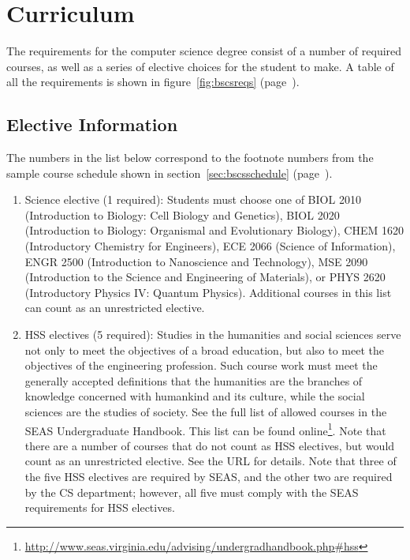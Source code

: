 \documentclass[10pt,letter,twocolumn]{book}
\newcommand{\mysection}[1]{\section{#1}\renewcommand{\rightmark}{#1}}
\newcommand{\myurl}[1]{\footnote{\scriptsize\url{#1}}}
\begin{document}
\mysection{Curriculum}

The requirements for the computer science degree consist of a number
of required courses, as well as a series of elective choices for the
student to make.  A table of all the requirements is shown in
figure~\ref{fig:bscsreqs} (page~\pageref{fig:bscsreqs}).

\subsection{Elective Information}
\label{sec:electiveinfo}

The numbers in the list below correspond to the footnote numbers from
the sample course schedule shown in section~\ref{sec:bscsschedule}
(page~\pageref{sec:bscsschedule}).

\begin{enumerate}

\item Science elective (1 required): Students must choose one of BIOL
  2010 (Introduction to Biology: Cell Biology and Genetics),
  BIOL 2020 (Introduction to Biology: Organismal and
  Evolutionary Biology), CHEM 1620 (Introductory Chemistry for
  Engineers), ECE 2066 (Science of Information), ENGR 2500
  (Introduction to Nano\-science and Technology), MSE 2090
  (Introduction to the Science and Engineering of Materials), or PHYS
  2620 (Introductory Physics IV: Quantum Physics). Additional
  courses in this list can count as an unrestricted elective.

\item HSS electives (5 required): Studies in the humanities and social
  sciences serve not only to meet the objectives of a broad education,
  but also to meet the objectives of the engineering profession. Such
  course work must meet the generally accepted definitions that the
  humanities are the branches of knowledge concerned with humankind
  and its culture, while the social sciences are the studies of
  society. See the full list of allowed courses in the SEAS
  Undergraduate Handbook. This list can be found
  online\myurl{http://www.seas.virginia.edu/advising/undergradhandbook.php\#hss}. Note
  that there are a number of courses that do not count as HSS
  electives, but would count as an unrestricted elective. See the URL
  for details.  Note that three of the five HSS electives are required by SEAS, and the other two are required by the CS department; however, all five must comply with the SEAS requirements for HSS electives.


\end{enumerate}
\end{document}

